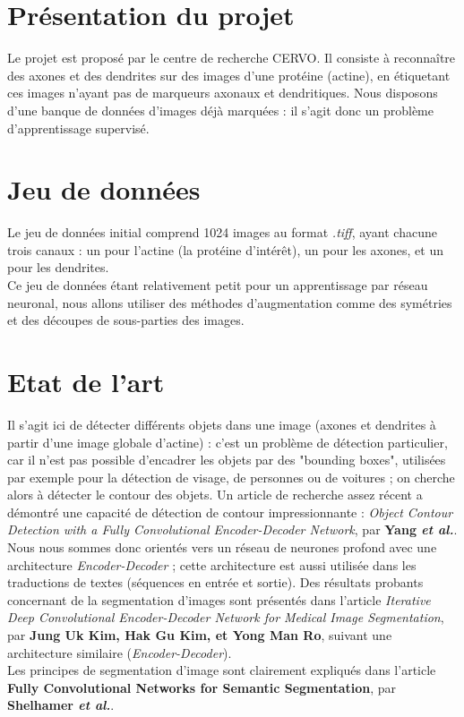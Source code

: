 \documentclass{report}
\begin{document}
\section{Présentation du projet}

Le projet est proposé par le centre de recherche CERVO.  Il consiste à reconnaître
des axones et des dendrites sur des images d’une protéine (actine), en étiquetant ces images
n’ayant pas de marqueurs axonaux et dendritiques. Nous disposons d’une banque de
données d’images déjà marquées : il s'agit donc un problème d’apprentissage supervisé.

\section{Jeu de données}

Le jeu de données initial comprend 1024 images au format \textit{.tiff}, ayant
chacune trois canaux : un pour l'actine (la protéine d'intérêt), un pour les axones,
et un pour les dendrites. \\
Ce jeu de données étant relativement petit pour un apprentissage par réseau neuronal,
nous allons utiliser des méthodes d'augmentation comme des symétries et des découpes
de sous-parties des images.

\section{Etat de l'art}

Il s'agit ici de détecter différents objets dans une image (axones et dendrites
à partir d'une image globale d'actine) : c'est un problème de détection particulier,
car il n'est pas possible d'encadrer les objets par des "bounding boxes", utilisées
par exemple pour la détection de visage, de personnes ou de voitures ; on cherche
alors à détecter le contour des objets. Un article de recherche assez récent a
démontré une capacité de détection de contour impressionnante : \textit{Object Contour
 Detection with a Fully Convolutional Encoder-Decoder Network}, par \textbf{Yang
 \textit{et al.}}. Nous nous sommes donc orientés vers un réseau de neurones profond
avec une architecture \textit{Encoder-Decoder} ; cette architecture est aussi
utilisée dans les traductions de textes (séquences en entrée et sortie). Des résultats
probants concernant de la segmentation d'images sont présentés dans l'article
\textit{Iterative Deep Convolutional Encoder-Decoder Network for Medical Image
 Segmentation}, par \textbf{Jung Uk Kim, Hak Gu Kim, et Yong Man Ro}, suivant une
architecture similaire (\textit{Encoder-Decoder}). \\
Les principes de segmentation d'image sont clairement expliqués dans l'article
\textbf{Fully Convolutional Networks for Semantic Segmentation}, par \textbf{Shelhamer
 \textit{et al.}}.
\end{document}
